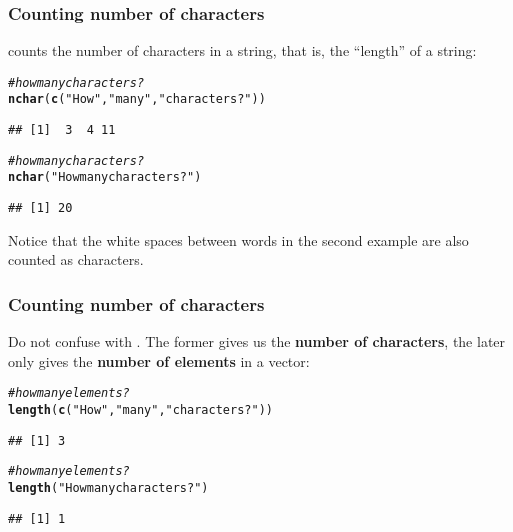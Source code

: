 \documentclass[12pt]{beamer}\usepackage[]{graphicx}\usepackage[]{color}
\makeatletter
\newcommand{\hlstr}[1]{\textcolor[rgb]{0.192,0.494,0.8}{#1}}%
\newcommand{\hlcom}[1]{\textcolor[rgb]{0.678,0.584,0.686}{\textit{#1}}}%
\newcommand{\hlstd}[1]{\textcolor[rgb]{0.345,0.345,0.345}{#1}}%
\newcommand{\hlkwd}[1]{\textcolor[rgb]{0.737,0.353,0.396}{\textbf{#1}}}%
\newenvironment{kframe}{%
 \def\at@end@of@kframe{}%
 \ifinner\ifhmode%
  \def\at@end@of@kframe{\end{minipage}}%
  \begin{minipage}{\columnwidth}%
 \fi\fi%
 \def\FrameCommand##1{\hskip\@totalleftmargin \hskip-\fboxsep
 \colorbox{shadecolor}{##1}\hskip-\fboxsep
     \hskip-\linewidth \hskip-\@totalleftmargin \hskip\columnwidth}%
 \MakeFramed {\advance\hsize-\width
   \@totalleftmargin\z@ \linewidth\hsize
   \@setminipage}}%
 {\par\unskip\endMakeFramed%
 \at@end@of@kframe}
\newenvironment{knitrout}{}{} %
\makeatother
\begin{document}

\begin{frame}[fragile]
\frametitle{Counting number of characters}

 counts the number of characters in a string, that is, the ``length'' of a string:
\begin{knitrout}\footnotesize
{}\color{fgcolor}\begin{kframe}
\begin{alltt}
\hlcom{# how many characters?}
\hlkwd{nchar}\hlstd{(}\hlkwd{c}\hlstd{(}\hlstr{"How"}\hlstd{,} \hlstr{"many"}\hlstd{,} \hlstr{"characters?"}\hlstd{))}
\end{alltt}
\begin{verbatim}
## [1]  3  4 11
\end{verbatim}
\begin{alltt}
\hlcom{# how many characters?}
\hlkwd{nchar}\hlstd{(}\hlstr{"How many characters?"}\hlstd{)}
\end{alltt}
\begin{verbatim}
## [1] 20
\end{verbatim}
\end{kframe}
\end{knitrout}
Notice that the white spaces between words in the second example are also counted as characters. 

\end{frame}


\begin{frame}[fragile]
\frametitle{Counting number of characters}

Do not confuse  with . The former gives us the \textbf{number of characters}, the later only gives the \textbf{number of elements} in a vector:
\begin{knitrout}\footnotesize
{}\color{fgcolor}\begin{kframe}
\begin{alltt}
\hlcom{# how many elements?}
\hlkwd{length}\hlstd{(}\hlkwd{c}\hlstd{(}\hlstr{"How"}\hlstd{,} \hlstr{"many"}\hlstd{,} \hlstr{"characters?"}\hlstd{))}
\end{alltt}
\begin{verbatim}
## [1] 3
\end{verbatim}
\begin{alltt}
\hlcom{# how many elements?}
\hlkwd{length}\hlstd{(}\hlstr{"How many characters?"}\hlstd{)}
\end{alltt}
\begin{verbatim}
## [1] 1
\end{verbatim}
\end{kframe}
\end{knitrout}

\end{frame}
\end{document}
